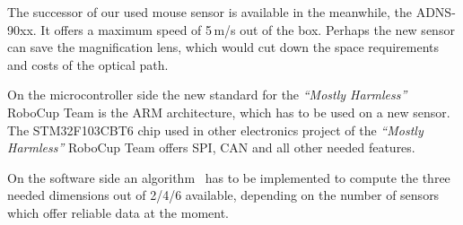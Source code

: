 \documentclass[12pt,a4paper]{article}
\newcommand{\MH}{\emph{``Mostly Harmless''} RoboCup Team\xspace}
\begin{document}
The successor of our used mouse sensor is available in the meanwhile, the ADNS-90xx.
It offers a maximum speed of 5\,m/s out of the box.
Perhaps the new sensor can save the magnification lens, which would cut down the space requirements and costs of the optical path.

On the microcontroller side the new standard for the \MH is the ARM architecture, which has to be used on a new sensor.
The STM32F103CBT6 chip used in other electronics project of the \MH offers SPI, CAN and all other needed features.

On the software side an algorithm~\cite{two_mice} has to be implemented to compute the three needed dimensions out of 2/4/6 available, depending on the number of sensors which offer reliable data at the moment.


\clearpage
{}
\label{Bibliography}


%
\end{document}
